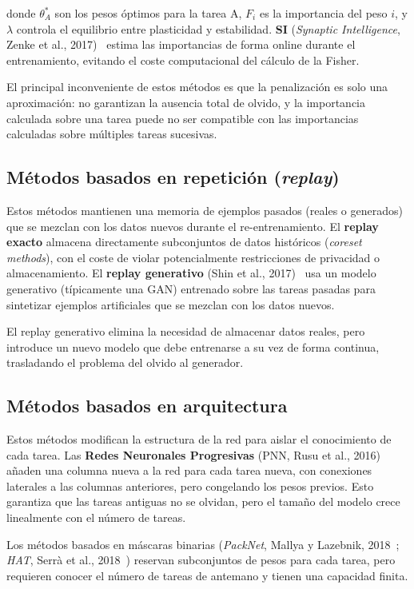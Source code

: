 donde $\theta^*_A$ son los pesos óptimos para la tarea A, $F_i$ es la importancia del peso $i$, y
$\lambda$ controla el equilibrio entre plasticidad y estabilidad. \textbf{SI} (\textit{Synaptic
Intelligence}, Zenke et al., 2017)~\cite{ref5} estima las importancias de forma online durante el
entrenamiento, evitando el coste computacional del cálculo de la Fisher.

El principal inconveniente de estos métodos es que la penalización es solo una aproximación: no
garantizan la ausencia total de olvido, y la importancia calculada sobre una tarea puede no ser
compatible con las importancias calculadas sobre múltiples tareas sucesivas.

\subsection{Métodos basados en repetición (\textit{replay})}

Estos métodos mantienen una memoria de ejemplos pasados (reales o generados) que se mezclan con los
datos nuevos durante el re-entrenamiento. El \textbf{replay exacto} almacena directamente
subconjuntos de datos históricos (\textit{coreset methods}), con el coste de violar potencialmente
restricciones de privacidad o almacenamiento. El \textbf{replay generativo} (Shin et
al., 2017)~\cite{ref10} usa un modelo generativo (típicamente una GAN) entrenado sobre las tareas
pasadas para sintetizar ejemplos artificiales que se mezclan con los datos nuevos.

El replay generativo elimina la necesidad de almacenar datos reales, pero introduce un nuevo modelo
que debe entrenarse a su vez de forma continua, trasladando el problema del olvido al generador.

\subsection{Métodos basados en arquitectura}

Estos métodos modifican la estructura de la red para aislar el conocimiento de cada tarea. Las
\textbf{Redes Neuronales Progresivas} (PNN, Rusu et al., 2016)~\cite{ref6} añaden una columna nueva
a la red para cada tarea nueva, con conexiones laterales a las columnas anteriores, pero congelando
los pesos previos. Esto garantiza que las tareas antiguas no se olvidan, pero el tamaño del modelo
crece linealmente con el número de tareas.

Los métodos basados en máscaras binarias (\textit{PackNet}, Mallya y Lazebnik, 2018~\cite{ref11};
\textit{HAT}, Serrà et al., 2018~\cite{ref12}) reservan subconjuntos de pesos para cada tarea, pero
requieren conocer el número de tareas de antemano y tienen una capacidad finita.

